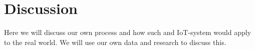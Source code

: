 \chapter{Discussion}

Here we will discuss our own process and how such and IoT-system would apply to the real world. We will use our own data and research to discuss this.




